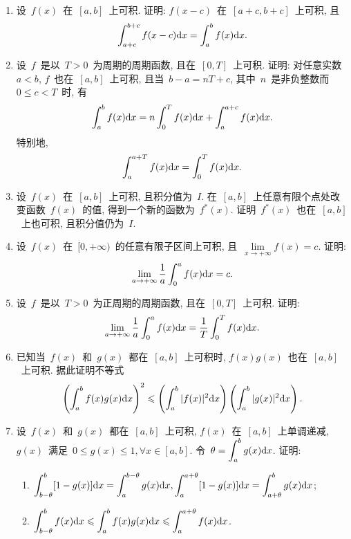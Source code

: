 \documentclass[UTF8,a4paper,20pt]{article}
\begin{document}
\begin{enumerate}
\item 设~$f(x)$~在~$[a,b]$~上可积. 证明: $f(x-c)$~在~$[a+c,b+c]$~上可积, 且
\[ \int_{a+c}^{b+c} f(x-c)\mathrm{d}x=\int_a^b f(x)\mathrm{d}x.\]

\item 设~$f$~是以~$T>0$~为周期的周期函数, 且在~$[0,T]$~上可积. 证明: 对任意实数~$a<b$, $f$~也在~$[a,b]$~上可积, 且当~$b-a=nT+c$, 其中~$n$~是非负整数而~$0\leqslant c<T$~时, 有
\[\int_a^b f(x)\mathrm{d}x=n\int_0^T f(x)\mathrm{d}x+\int_a^{a+c} f(x)\mathrm{d}x.\]
特别地, 
\[\int_a^{a+T} f(x)\mathrm{d}x=\int_0^{T}f(x)\mathrm{d}x.\]

\item 设~$f(x)$~在~$[a,b]$~上可积, 且积分值为~$I$. 在~$[a,b]$~上任意有限个点处改变函数~$f(x)$~的值, 得到一个新的函数为~$f^{*}(x)$. 证明~$f^{*}(x)$~也在~$[a,b]$~上也可积, 且积分值仍为~$I$.

\item 设~$f(x)$~在~$[0,+\infty)$~的任意有限子区间上可积, 且~$\lim\limits_{x\to+\infty} f(x)=c$. 证明:
\[ \lim\limits_{a\to+\infty} \dfrac{1}{a}\int_0^a f(x)\mathrm{d}x=c.\]

\item 设~$f$~是以~$T>0$~为正周期的周期函数, 且在~$[0,T]$~上可积. 证明:
\[ \lim\limits_{a\to+\infty} \dfrac{1}{a}\int_0^a f(x)\mathrm{d}x=\dfrac{1}{T}\int_0^T f(x)\mathrm{d}x.\]

\item 已知当~$f(x)$~和~$g(x)$~都在~$[a,b]$~上可积时, $f(x)g(x)$~也在~$[a,b]$~上可积. 据此证明不等式
\[ \left(\int_a^b f(x)g(x)\mathrm{d}x\right)^2\leqslant \left(\int_a^b |f(x)|^2\mathrm{d}x\right) \left( \int_a^b |g(x)|^2\mathrm{d}x \right). \]

\item 设~$f(x)$~和~$g(x)$~都在~$[a,b]$~上可积, $f(x)$~在~$[a,b]$~上单调递减, $g(x)$~满足~$0\leqslant g(x)\leqslant 1, \forall x\in[a,b]$. 令~$\displaystyle\theta=\int_a^b g(x)\mathrm{d}x$. 证明:
	\begin{enumerate}[(1)]
	\item $\displaystyle\int_{b-\theta}^b [1-g(x)]\mathrm{d}x=\int_a^{b-\theta} g(x)\mathrm{d}x, \int_a^{a+\theta}[1-g(x)]\mathrm{d}x=\int_{a+\theta}^b g(x)\mathrm{d}x$;
	\item $\displaystyle\int_{b-\theta}^b f(x)\mathrm{d}x\leqslant\int_a^b f(x)g(x)\mathrm{d}x\leqslant\int_a^{a+\theta} f(x)\mathrm{d}x$.
	\end{enumerate}
\end{enumerate}

\clearpage
\end{document}
